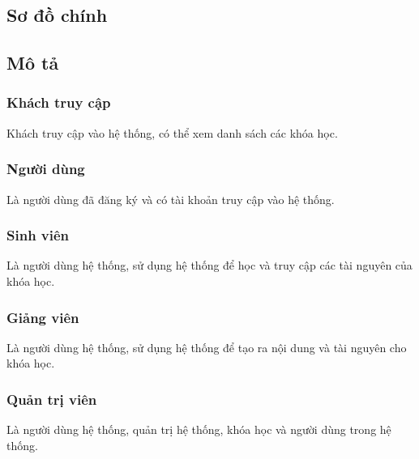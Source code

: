 \documentclass[./../main_file.tex]{subfiles}
\begin{document}
\subsection{Sơ đồ chính}

\begin{figure}[h!]
	\centering
	\resizebox{1.2\textwidth}{!}{}
\end{figure}

\subsection{Mô tả}
	\subsubsection{Khách truy cập}
	Khách truy cập vào hệ thống, có thể xem danh sách các khóa học.
	
	\subsubsection{Người dùng}
	Là người dùng đã đăng ký và có tài khoản truy cập vào hệ thống.
	
	\subsubsection{Sinh viên}
	Là người dùng hệ thống, sử dụng hệ thống để học và truy cập các tài nguyên của khóa học.
	
	\subsubsection{Giảng viên}
	Là người dùng hệ thống, sử dụng hệ thống để tạo ra nội dung và tài nguyên cho khóa học.
	
	\subsubsection{Quản trị viên}
	Là người dùng hệ thống, quản trị hệ thống, khóa học và người dùng trong hệ thống.
	
	
\end{document}
